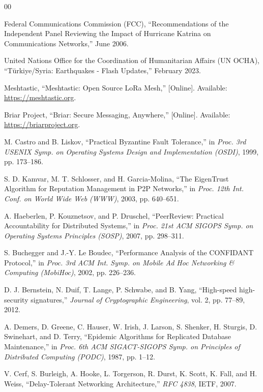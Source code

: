 \documentclass[conference]{IEEEtran}
\begin{document}
\begin{thebibliography}{00}

Federal Communications Commission (FCC), ``Recommendations of the Independent Panel Reviewing the Impact of Hurricane Katrina on Communications Networks,'' June 2006.

United Nations Office for the Coordination of Humanitarian Affairs (UN OCHA), ``T\"urkiye/Syria: Earthquakes - Flash Updates,'' February 2023.

Meshtastic, ``Meshtastic: Open Source LoRa Mesh,'' [Online]. Available: \url{https://meshtastic.org}.

Briar Project, ``Briar: Secure Messaging, Anywhere,'' [Online]. Available: \url{https://briarproject.org}.

M. Castro and B. Liskov, ``Practical Byzantine Fault Tolerance,'' in \textit{Proc. 3rd USENIX Symp. on Operating Systems Design and Implementation (OSDI)}, 1999, pp. 173--186.

S. D. Kamvar, M. T. Schlosser, and H. Garcia-Molina, ``The EigenTrust Algorithm for Reputation Management in P2P Networks,'' in \textit{Proc. 12th Int. Conf. on World Wide Web (WWW)}, 2003, pp. 640--651.

A. Haeberlen, P. Kouznetsov, and P. Druschel, ``PeerReview: Practical Accountability for Distributed Systems,'' in \textit{Proc. 21st ACM SIGOPS Symp. on Operating Systems Principles (SOSP)}, 2007, pp. 298--311.

S. Buchegger and J.-Y. Le Boudec, ``Performance Analysis of the CONFIDANT Protocol,'' in \textit{Proc. 3rd ACM Int. Symp. on Mobile Ad Hoc Networking \& Computing (MobiHoc)}, 2002, pp. 226--236.

D. J. Bernstein, N. Duif, T. Lange, P. Schwabe, and B. Yang, ``High-speed high-security signatures,'' \textit{Journal of Cryptographic Engineering}, vol. 2, pp. 77--89, 2012.

A. Demers, D. Greene, C. Hauser, W. Irish, J. Larson, S. Shenker, H. Sturgis, D. Swinehart, and D. Terry, ``Epidemic Algorithms for Replicated Database Maintenance,'' in \textit{Proc. 6th ACM SIGACT-SIGOPS Symp. on Principles of Distributed Computing (PODC)}, 1987, pp. 1--12.

V. Cerf, S. Burleigh, A. Hooke, L. Torgerson, R. Durst, K. Scott, K. Fall, and H. Weiss, ``Delay-Tolerant Networking Architecture,'' \textit{RFC 4838}, IETF, 2007.


\end{thebibliography}
\end{document}
